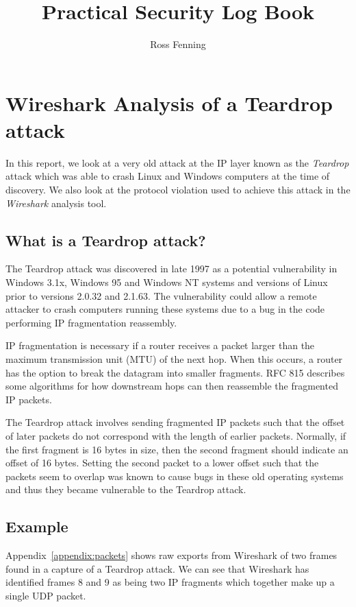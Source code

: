 \documentclass{report}
\title{Practical Security Log Book}
\author{Ross Fenning}
\begin{document}
\maketitle
\tableofcontents

\chapter{Wireshark Analysis of a Teardrop attack}

In this report, we look at a very old attack at the IP layer
known as the \emph{Teardrop} attack which was able to crash
Linux and Windows computers at the time of discovery.
We also look at the protocol violation used to achieve this attack
in the \emph{Wireshark} analysis tool.

\section{What is a Teardrop attack?}

The Teardrop attack \parencite{center1997cert} was discovered
in late 1997 as a potential vulnerability in Windows 3.1x, Windows 95 and Windows NT
systems and versions of Linux prior to versions 2.0.32 and 2.1.63.
The vulnerability could allow a remote attacker to crash computers
running these systems due to a bug in the code performing IP fragmentation
reassembly.

IP fragmentation \parencite{postel1981rfc,fall2011tcp} is necessary if a router
receives a packet larger than the maximum transmission unit (MTU) of the
next hop. When this occurs, a router has the option to break the datagram
into smaller fragments. RFC 815 \parencite{clark1982ip} describes
some algorithms for how downstream hops can then reassemble the fragmented
IP packets.

The Teardrop attack involves sending fragmented IP packets such that the offset
of later packets do not correspond with the length of earlier packets. Normally,
if the first fragment is 16 bytes in size, then the second fragment should
indicate an offset of 16 bytes. Setting the second packet to a lower
offset such that the packets seem to overlap was known to cause bugs in
these old operating systems and thus they became vulnerable to the Teardrop
attack.

\section{Example}

Appendix~\ref{appendix:packets} shows raw exports from Wireshark of two frames
found in a capture of a Teardrop attack. We can see that Wireshark has identified
frames 8 and 9 as being two IP fragments which together make up a single UDP
packet.
\end{document}
